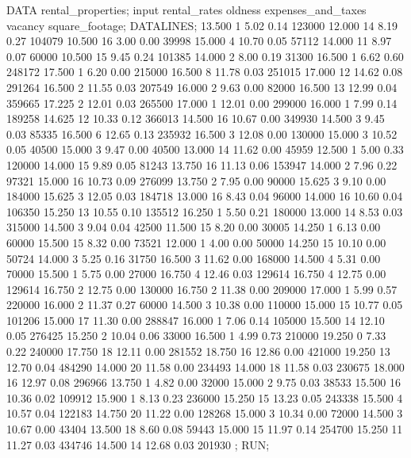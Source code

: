 \begin{appendices}
\begin{SAScode}
DATA rental_properties;
input rental_rates oldness expenses_and_taxes vacancy square_footage;
DATALINES;
 13.500     1    5.02   0.14    123000
 12.000    14    8.19   0.27    104079
 10.500    16    3.00   0.00     39998
 15.000     4   10.70   0.05     57112
 14.000    11    8.97   0.07     60000
 10.500    15    9.45   0.24    101385
 14.000     2    8.00   0.19     31300
 16.500     1    6.62   0.60    248172
 17.500     1    6.20   0.00    215000
 16.500     8   11.78   0.03    251015
 17.000    12   14.62   0.08    291264
 16.500     2   11.55   0.03    207549
 16.000     2    9.63   0.00     82000
 16.500    13   12.99   0.04    359665
 17.225     2   12.01   0.03    265500
 17.000     1   12.01   0.00    299000
 16.000     1    7.99   0.14    189258
 14.625    12   10.33   0.12    366013
 14.500    16   10.67   0.00    349930
 14.500     3    9.45   0.03     85335
 16.500     6   12.65   0.13    235932
 16.500     3   12.08   0.00    130000
 15.000     3   10.52   0.05     40500
 15.000     3    9.47   0.00     40500
 13.000    14   11.62   0.00     45959
 12.500     1    5.00   0.33    120000
 14.000    15    9.89   0.05     81243
 13.750    16   11.13   0.06    153947
 14.000     2    7.96   0.22     97321
 15.000    16   10.73   0.09    276099
 13.750     2    7.95   0.00     90000
 15.625     3    9.10   0.00    184000
 15.625     3   12.05   0.03    184718
 13.000    16    8.43   0.04     96000
 14.000    16   10.60   0.04    106350
 15.250    13   10.55   0.10    135512
 16.250     1    5.50   0.21    180000
 13.000    14    8.53   0.03    315000
 14.500     3    9.04   0.04     42500
 11.500    15    8.20   0.00     30005
 14.250     1    6.13   0.00     60000
 15.500    15    8.32   0.00     73521
 12.000     1    4.00   0.00     50000
 14.250    15   10.10   0.00     50724
 14.000     3    5.25   0.16     31750
 16.500     3   11.62   0.00    168000
 14.500     4    5.31   0.00     70000
 15.500     1    5.75   0.00     27000
 16.750     4   12.46   0.03    129614
 16.750     4   12.75   0.00    129614
 16.750     2   12.75   0.00    130000
 16.750     2   11.38   0.00    209000
 17.000     1    5.99   0.57    220000
 16.000     2   11.37   0.27     60000
 14.500     3   10.38   0.00    110000
 15.000    15   10.77   0.05    101206
 15.000    17   11.30   0.00    288847
 16.000     1    7.06   0.14    105000
 15.500    14   12.10   0.05    276425
 15.250     2   10.04   0.06     33000
 16.500     1    4.99   0.73    210000
 19.250     0    7.33   0.22    240000
 17.750    18   12.11   0.00    281552
 18.750    16   12.86   0.00    421000
 19.250    13   12.70   0.04    484290
 14.000    20   11.58   0.00    234493
 14.000    18   11.58   0.03    230675
 18.000    16   12.97   0.08    296966
 13.750     1    4.82   0.00     32000
 15.000     2    9.75   0.03     38533
 15.500    16   10.36   0.02    109912
 15.900     1    8.13   0.23    236000
 15.250    15   13.23   0.05    243338
 15.500     4   10.57   0.04    122183
 14.750    20   11.22   0.00    128268
 15.000     3   10.34   0.00     72000
 14.500     3   10.67   0.00     43404
 13.500    18    8.60   0.08     59443
 15.000    15   11.97   0.14    254700
 15.250    11   11.27   0.03    434746
 14.500    14   12.68   0.03    201930
  ;
  RUN; 


\end{SAScode}
\end{appendices}
